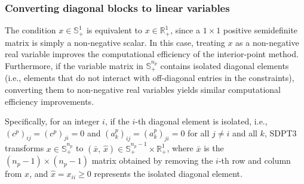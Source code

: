 \subsubsection{Converting diagonal blocks to linear variables}
The condition $x\in \mathbb{S}^1_+$ is equivalent to $x\in \mathbb{R}^1_+$, since a $1\times 1$ positive semidefinite matrix is simply a non-negative scalar.
In this case, treating $x$ as a non-negative real variable improves the computational efficiency of the interior-point method.
Furthermore, if the variable matrix in $\mathbb{S}^{n_p}_+$ contains isolated diagonal elements (i.e., elements that do not interact with off-diagonal entries in the constraints), converting them to non-negative real variables yields similar computational efficiency improvements.

Specifically, for an integer $i$, if the $i$-th diagonal element is isolated, i.e.,
$(c^p)_{ij}=(c^p)_{ji}=0$ and $(a^p_k)_{ij}=(a^p_k)_{ji}=0$ for all $j\neq i$ and all $k$,
SDPT3 transforms $x\in \mathbb{S}^{n_p}_+$ to $(\bar{x},\,\hat{x})\in \mathbb{S}^{n_p-1}_+\times \mathbb{R}^1_+$,
where $\bar{x}$ is the $(n_p-1)\times(n_p-1)$ matrix obtained by removing the $i$-th row and column from $x$,
and $\hat{x} = x_{ii} \geq 0$ represents the isolated diagonal element.

